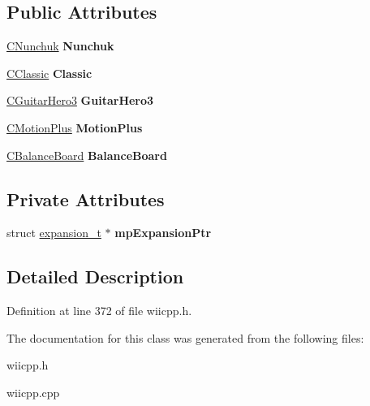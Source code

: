 \subsection*{\-Public \-Attributes}
\begin{DoxyCompactItemize}
\item 
\hypertarget{class_c_expansion_device_a9a30f45df41f2e0457fe3f57c0f0f53e}{\hyperlink{class_c_nunchuk}{\-C\-Nunchuk} {\bfseries \-Nunchuk}}\label{class_c_expansion_device_a9a30f45df41f2e0457fe3f57c0f0f53e}

\item 
\hypertarget{class_c_expansion_device_a2d84fd3250518acbcb28c733277a9931}{\hyperlink{class_c_classic}{\-C\-Classic} {\bfseries \-Classic}}\label{class_c_expansion_device_a2d84fd3250518acbcb28c733277a9931}

\item 
\hypertarget{class_c_expansion_device_a9ebd876c248d2b0242bf06181735a4e1}{\hyperlink{class_c_guitar_hero3}{\-C\-Guitar\-Hero3} {\bfseries \-Guitar\-Hero3}}\label{class_c_expansion_device_a9ebd876c248d2b0242bf06181735a4e1}

\item 
\hypertarget{class_c_expansion_device_a49310ff81cc6b9ac43839cb7f596cfa2}{\hyperlink{class_c_motion_plus}{\-C\-Motion\-Plus} {\bfseries \-Motion\-Plus}}\label{class_c_expansion_device_a49310ff81cc6b9ac43839cb7f596cfa2}

\item 
\hypertarget{class_c_expansion_device_aae5430823c39c8e8b836200b9b29ac42}{\hyperlink{class_c_balance_board}{\-C\-Balance\-Board} {\bfseries \-Balance\-Board}}\label{class_c_expansion_device_aae5430823c39c8e8b836200b9b29ac42}

\end{DoxyCompactItemize}
\subsection*{\-Private \-Attributes}
\begin{DoxyCompactItemize}
\item 
\hypertarget{class_c_expansion_device_a14884d7764e4c850f61c34f45ed2b97c}{struct \hyperlink{structexpansion__t}{expansion\-\_\-t} $\ast$ {\bfseries mp\-Expansion\-Ptr}}\label{class_c_expansion_device_a14884d7764e4c850f61c34f45ed2b97c}

\end{DoxyCompactItemize}


\subsection{\-Detailed \-Description}


\-Definition at line 372 of file wiicpp.\-h.



\-The documentation for this class was generated from the following files\-:\begin{DoxyCompactItemize}
\item 
wiicpp.\-h\item 
wiicpp.\-cpp\end{DoxyCompactItemize}
